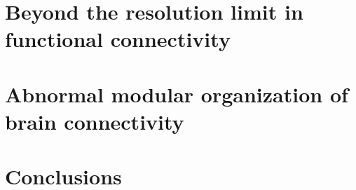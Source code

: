 \chapter{Beyond the resolution limit in functional connectivity}


\chapter{Abnormal modular organization of brain connectivity}

\chapter{Conclusions}\label{chap:conclusions}







%	

